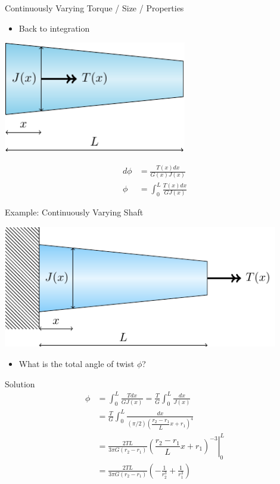 \documentclass[10pt, svgnames]{beamer}
\begin{document}
\begin{frame}[label={sec:org7c5cee1}]{Continuously Varying Torque / Size / Properties}
\begin{itemize}
\item Back to integration
\end{itemize}

\begin{center}
\includegraphics[width=0.6\textwidth]{pictures/cont-vary.pdf}
\end{center}

\begin{align*}
  d\phi &= \frac{T(x) dx}{G(x) J(x)} \\
  \phi  &= \int_0^L \frac{T(x)dx}{G{J(x)}}
\end{align*}
\end{frame}

\begin{frame}[label={sec:org8cd54b1}]{Example: Continuously Varying Shaft}
\begin{center}
\includegraphics[width=0.9\textwidth]{pictures/cont-vary-example.pdf}
\end{center}

\begin{itemize}
\item What is the total angle of twist \(\phi\)?
\end{itemize}
\end{frame}

\begin{frame}[label={sec:org24161d1}]{Solution}
\begin{align*}
  \phi &= \int_{0}^{L} \frac{Tdx}{GJ(x)} = \frac{T}{G} \int_{0}^{L} \frac{dx}{J(x)} \\
       &= \frac{T}{G} \int_{0}^{L} \frac{dx}{(\pi/2) \left(\dfrac{r_{2} - r_{1}}{L}x + r_{1}\right)^{4}} \\
       &= \frac{2TL}{3\pi G (r_{2} - r_{1})} \left. \left(\dfrac{r_{2} - r_{1}}{L}x + r_{1}\right)^{-3}  \right|_{0}^{L} \\
       &= \frac{2TL}{3\pi G (r_{2} - r_{1})} \left( -\frac{1}{r_{2}^{3}} + \frac{1}{r_{1}^{3}} \right)
\end{align*}
\end{frame}
\end{document}

